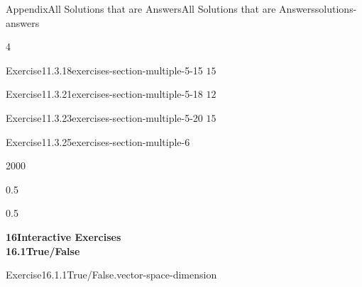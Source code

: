 \documentclass[twoside,10pt,]{article}
\newcommand{\tabularfont}{\relax}
\numberwithin{equation}{section}
\newcommand{\hrulemedium}{\noalign{\hrule height 0.07em}}
\begin{document}
\begin{solutions-section}{Appendix}{All Solutions that are Answers}{}{All Solutions that are Answers}{}{}{solutions-answers}
\begin{exercisegroupcol}{4}
\begin{divisionsolutionegcol}{Exercise}{11.3.18}{}{exercises-section-multiple-5-15}
\noindent\hypertarget{exercises-section-multiple-5-15-2-back}{}\(15\)%
\end{divisionsolutionegcol}%
\begin{divisionsolutionegcol}{Exercise}{11.3.21}{}{exercises-section-multiple-5-18}%
\noindent\hypertarget{exercises-section-multiple-5-18-3-back}{}\(12\)%
\end{divisionsolutionegcol}%
\begin{divisionsolutionegcol}{Exercise}{11.3.23}{}{exercises-section-multiple-5-20}%
\noindent\hypertarget{exercises-section-multiple-5-20-2-back}{}\(15\)%
\end{divisionsolutionegcol}%
\end{exercisegroupcol}
\par\medskip\noindent
\begin{divisionsolution}{Exercise}{11.3.25}{}{exercises-section-multiple-6}%
\noindent\hypertarget{exercises-section-multiple-6-2-back}{}\begin{sidebyside}{2}{0}{0}{0}%
\begin{sbspanel}{0.5}%
\noindent\resizebox{\ifdim\width > \linewidth\linewidth\else\width\fi}{!}{%
{\centering%
{\tabularfont%
\begin{tabular}{cc}
{\bfseries{}\(x\)}&{\bfseries{}\(f(x)\)}\tabularnewline\hrulemedium
\(0\)&\(0\)\tabularnewline[0pt]
\(1\)&\(1\)\tabularnewline[0pt]
\(2\)&\(4\)\tabularnewline[0pt]
\(3\)&\(9\)
\end{tabular}
}%
\par}
}%
\end{sbspanel}%
\begin{sbspanel}{0.5}%
\noindent{}%
\end{sbspanel}%
\end{sidebyside}%
\end{divisionsolution}%
\par\medskip
\noindent\textbf{\large{}16\space\textperiodcentered\space{}Interactive Exercises\\
16.1\space\textperiodcentered\space{}True\slash{}False}
\begin{divisionsolution}{Exercise}{16.1.1}{True\slash{}False.}{vector-space-dimension}%
\par\smallskip%

\end{divisionsolution}
\end{solutions-section}
\end{document}
